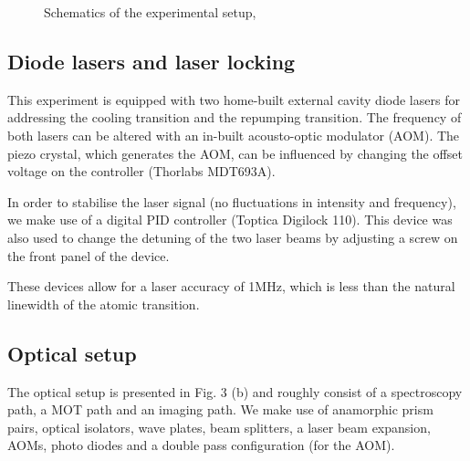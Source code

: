 \documentclass[12pt, a4paper]{article}
\begin{document}
\begin{figure}[h]
\centering
\caption{Schematics of the experimental setup, \cite{script}}
	\label{expsetup}
\end{figure}

\subsection{Diode lasers and laser locking}
This experiment is equipped with two home-built external cavity diode lasers for addressing the cooling transition and the repumping transition. The frequency of both lasers can be altered with an in-built acousto-optic modulator (AOM). The piezo crystal, which generates the AOM, can be influenced by changing the offset voltage on the controller (Thorlabs MDT693A).

In order to stabilise the laser signal (no fluctuations in intensity and frequency), we make use of a digital PID controller (Toptica Digilock 110). This device was also used to change the detuning of the two laser beams by adjusting a screw on the front panel of the device.

These devices allow for a laser accuracy of 1MHz, which is less than the natural linewidth of the atomic transition.

\subsection{Optical setup}
The optical setup is presented in Fig. 3 (b) and roughly consist of a spectroscopy path, a MOT path and an imaging path. We make use of anamorphic prism pairs, optical isolators, wave plates, beam splitters, a laser beam expansion, AOMs, photo diodes and a double pass configuration (for the AOM).
\end{document}
